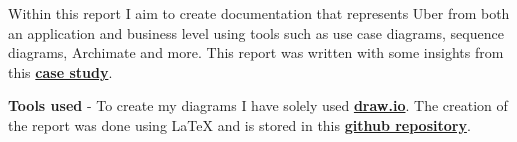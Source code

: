 \documentclass{article}
\begin{document}
    Within this report I aim to create documentation that represents Uber from both an application and business level using tools such as 
    use case diagrams, sequence diagrams, Archimate and more. This report was written with some insights from this \href{https://learn-eu-central-1-prod-fleet01-xythos.content.blackboardcdn.com/5d2cb9c32e9d7/4991549?X-Blackboard-Expiration=1653922800000&X-Blackboard-Signature=a2RnywjBpwblbDHmnp%2BXEpXu5N%2FFoCmkQs%2FBPlAAUAo%3D&X-Blackboard-Client-Id=163100&response-cache-control=private%2C%20max-age%3D21600&response-content-disposition=inline%3B%20filename%2A%3DUTF-8%27%27Reading1-Uber-CaseStudy%2520%25281%2529.hai.pdf&response-content-type=application%2Fpdf&X-Amz-Security-Token=IQoJb3JpZ2luX2VjEBgaDGV1LWNlbnRyYWwtMSJGMEQCIHIn%2BZn3gy3MjoPp7PH8o8SnEhgHocgjO0CPywLkcPIXAiAIwi1oSntPYzMUdrA%2FGVOy4wq4jKDGcCVfnD7ffXaIkSrcBAgREAIaDDYzNTU2NzkyNDE4MyIMbRXWMdMQ5uaeyu%2BXKrkEseD2PJmHV%2Fj1ElO5YaeFrgTrUJewyFaGJTLDptki%2Fw6Q%2Bfwo0H6dymEdL4rI6suCDdx2RwJxWKHNCDeFPFh15O0H6KG3qCcX%2FovlcsZ%2Bh499B6hJiMWnFXvUnuWaPcx%2BV6e01ECkcMfeo7brbj8ESEg6SQIJ1nX5BXlg7UtRDLXTosDkKcWx7v1BCND32q1UkRbr%2Bs5J4iZpddBWaxLUsea0LF%2BjlQiS8%2FXREUTvbtgPmNRLSuQAbM7KWHTnEZvsbWOvwSG8nkcbQE8yTiQFrpoRUuWYt33NAVg6HXxNAwqTHGcVA8nbiPt2bN%2FLjEt344CUJYG0gA35UCtYf3DR0PrCzbrV2pEVioy0%2FX9Kvvbv2h1WYHvGD1Q%2BvrXMhizyd2InWYiU1X4EeMC7Im1rHbYt0qo3RXKqZlzNxM%2F0zaNe0IRkbsGQJarkF5DP3bz7NeU188afhSfu7T6xYhAajAVrnGxhooCc3YI66br60NygfY2OAp2MeKI6dzNw0FdfsaA31f%2BZasU9n2aP3weV7AwZvaGMpGoXahuvjnJ9mKuWKc6HrWu8HPJhq7Wr3mOC9bd8YBDG2WzIrB9kM45iNQOTG67CMF5x7eXj4KNVntZgG63Jn%2BBxiVLgIxMR55%2BsA0IkQ9DXQoj0esQ2J3JBystYLTp79c5N5hB4iUr1w4i%2Fm20B1XVarZjUTObKPU%2FOhVMd2J0L3G3zBNVRH0el8n8UoO1L8s8M%2BITAhjLhoOO7%2BLkRlFfNmSUwpPvRlAY6qgH6gVLQCu8%2B4x1Gr4OZSSDIGJg8JceJGTGUuQTC4zObK%2FZFQf%2BCrgd5Yq9gmyB%2BAOERsBIpT6ovUVoNUY5CAx%2FHixZ6KneGKse3MAew4DX1G%2BVgC9yLWmgKAHtv0GZxfXyNshE3L9BSYbygxLiRZTj%2BEnF1Sb5WuM%2FANwhzfr%2Fv7xbJO8gk6ThTqegZJ%2FVz13WjTdieKNSwy4yyux01cLEanOenPhlqjOhSpg%3D%3D&X-Amz-Algorithm=AWS4-HMAC-SHA256&X-Amz-Date=20220530T090000Z&X-Amz-SignedHeaders=host&X-Amz-Expires=21600&X-Amz-Credential=ASIAZH6WM4PL5GS33QWA%2F20220530%2Feu-central-1%2Fs3%2Faws4_request&X-Amz-Signature=3bdd17adaf97b1927bdb8b06a7be5ddc78ca982d1660562cfa92729d6cdc622f}{\textbf{case study}}.

    \vspace{0.2cm}

    \noindent\textbf{Tools used} - To create my diagrams I have solely used \href{https://draw.io}{\textbf{draw.io}}. The creation of the report was done using LaTeX and is stored in 
    this \href{https://github.com/OMBowkerBBC/DC4100-Assignment-1}{\textbf{github repository}}.
    \newpage
  
\end{document}

